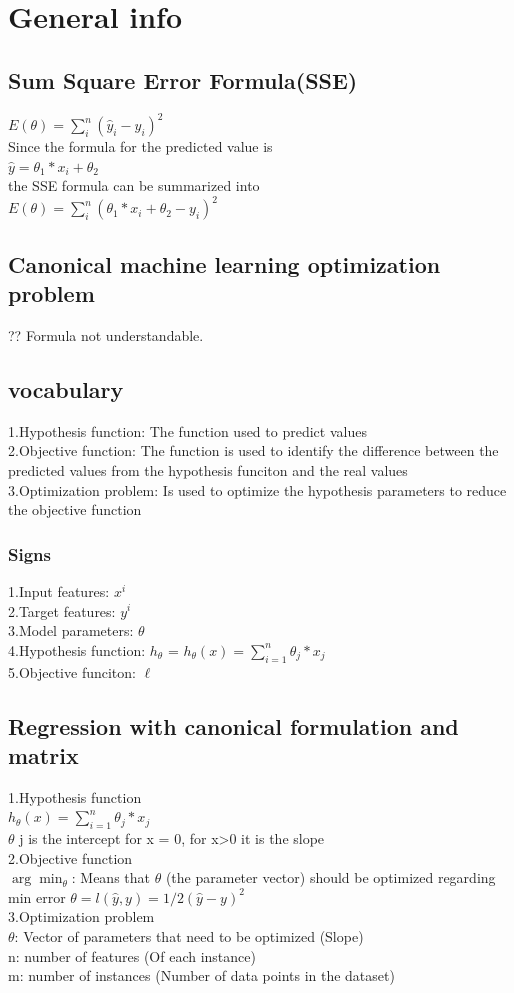 \documentclass{article}
\begin{document}
\section{General info}
\subsection{Sum Square Error Formula(SSE)}
$E(\theta)= \sum_{i}^{n} (\hat{y}_i - y_i)^2$ \\
Since the formula for the predicted value is \\
$\hat{y} = \theta_1 * x_i + \theta_2$ \\ 
the SSE formula can be summarized into\\
$ E(\theta) = \sum_{i}^{n} (\theta_1 * x_i + \theta_2 - y_i) ^2$
\subsection{Canonical machine learning optimization problem}
?? Formula not understandable.

\subsection{vocabulary}
1.Hypothesis function: The function used to predict values \\
2.Objective function: The function is used to identify the difference between the predicted values from the hypothesis funciton and the real values \\
3.Optimization problem: Is used to optimize the hypothesis parameters to reduce the objective function
\subsubsection{Signs}
1.Input features: $x^i$ \\
2.Target features: $y^i$ \\
3.Model parameters: $\theta$ \\ 
4.Hypothesis function: $h_\theta$ = $h_\theta(x) = \sum_{i=1}^{n} \theta_j * x_j$ \\
5.Objective funciton: $\ell$

\subsection{Regression with canonical formulation and matrix}
1.Hypothesis function \\ 
$h_\theta(x) = \sum_{i=1}^{n} \theta_j * x_j$ \\
$\theta$ j is the intercept for x = 0, for x>0 it is the slope \\
2.Objective function \\
$\arg\min_{\theta}$: Means that $ \theta$ (the parameter vector) should be optimized regarding min error
$  \theta = l(\hat{y}, y) =  1/2 (\hat{y}-y)^2$ \\ 
3.Optimization problem \\
$\theta$: Vector of parameters that need to be optimized (Slope) \\
n: number of features (Of each instance) \\ 
m: number of instances (Number of data points in the dataset) \\
\end{document}
